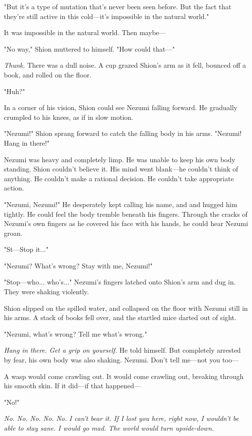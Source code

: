 "But it's a type of mutation that's never been seen before. But the fact
that they're still active in this cold---it's impossible in the natural
world."

It was impossible in the natural world. Then maybe---

"No way," Shion muttered to himself. "How could that---"

\emph{Thunk.} There was a dull noise. A cup grazed Shion's arm as it fell,
bounced off a book, and rolled on the floor.

"Huh?"

In a corner of his vision, Shion could see Nezumi falling forward. He
gradually crumpled to his knees, as if in slow motion.

"Nezumi!" Shion sprang forward to catch the falling body in his arms.
"Nezumi! Hang in there!"

Nezumi was heavy and completely limp. He was unable to keep his own body
standing. Shion couldn't believe it. His mind went blank---he couldn't
think of anything. He couldn't make a rational decision. He couldn't
take appropriate action.

"Nezumi, Nezumi!" He desperately kept calling his name, and and hugged
him tightly. He could feel the body tremble beneath his fingers. Through
the cracks of Nezumi's own fingers as he covered his face with his
hands, he could hear Nezumi groan.

"St---Stop it..."

"Nezumi? What's wrong? Stay with me, Nezumi!"

"Stop---who... who's..." Nezumi's fingers latched onto Shion's arm and dug
in. They were shaking violently.

Shion slipped on the spilled water, and collapsed on the floor with
Nezumi still in his arms. A stack of books fell over, and the startled
mice darted out of sight.

"Nezumi, what's wrong? Tell me what's wrong."

\emph{Hang in there. Get a grip on yourself.} He told himself. But completely
arrested by fear, his own body was also shaking. Nezumi. Don't tell
me---not you too---

A wasp would come crawling out. It would come crawling out, breaking
through his smooth skin. If it did---if that happened---

"No!"

\emph{No. No. No. No. No. I can't bear it. If I lost you here, right now, I
wouldn't be able to stay sane. I would go mad. The world would turn
upside-down.}

